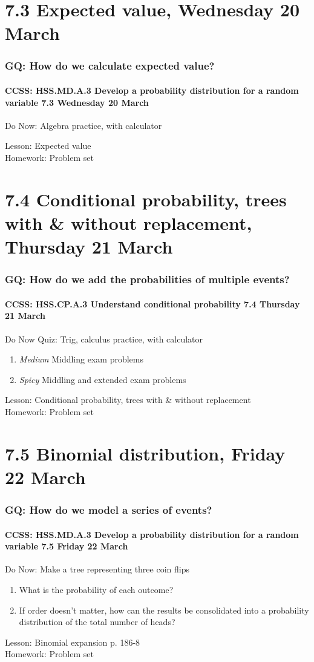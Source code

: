 \documentclass{beamer}
\begin{document}
  \section{7.3 Expected value, Wednesday 20 March}
    \frame
    {
      \frametitle{GQ: How do we calculate expected value?}
      \framesubtitle{CCSS: HSS.MD.A.3 Develop a probability distribution for a random variable \hfill \alert{7.3 Wednesday 20 March}}

      \begin{block}{Do Now: Algebra practice, with calculator}
      \end{block}

      Lesson: Expected value \\
      Homework: Problem set
    }

\section{7.4 Conditional probability, trees with \& without replacement, Thursday 21 March}
  \frame
  {
    \frametitle{GQ: How do we add the probabilities of multiple events?}
    \framesubtitle{CCSS: HSS.CP.A.3 Understand conditional probability \hfill \alert{7.4 Thursday 21 March}}

    \begin{block}{Do Now Quiz: Trig, calculus practice, with calculator}
    \begin{enumerate}
        \item \emph{Medium} Middling exam problems
        \item \emph{Spicy} Middling and extended exam problems
    \end{enumerate}
    \end{block}

    Lesson: Conditional probability, trees with \& without replacement \\
    Homework: Problem set
  }

\section{7.5 Binomial distribution, Friday 22 March}
  \frame
  {
    \frametitle{GQ: How do we model a series of events?}
    \framesubtitle{CCSS: HSS.MD.A.3 Develop a probability distribution for a random variable \hfill \alert{7.5 Friday 22 March}}

    \begin{block}{Do Now: Make a tree representing three coin flips}
    \begin{enumerate}
        \item What is the probability of each outcome?
        \item If order doesn't matter, how can the results be consolidated into a probability distribution of the total number of heads?
    \end{enumerate}
    \end{block}
    Lesson:  Binomial expansion p. 186-8\\%
    Homework: Problem set
  }
\end{document}
